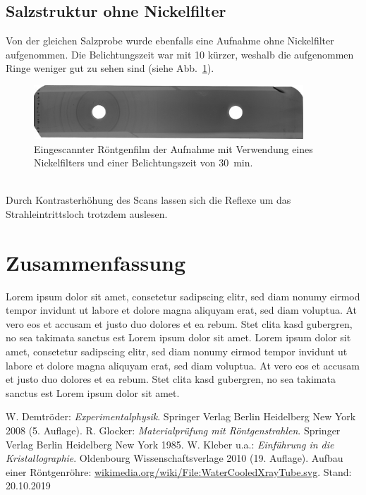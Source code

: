 \documentclass[a4paper,twoside,final]{article}
\begin{document}
\subsection{Salzstruktur ohne Nickelfilter}
Von der gleichen Salzprobe wurde ebenfalls eine Aufnahme ohne Nickelfilter aufgenommen. Die Belichtungszeit war mit \SI{10}{\min} kürzer, weshalb die aufgenommen Ringe weniger gut zu sehen sind (siehe Abb.~\ref{fig:Film_ohneFilter}).
\begin{figure}[htp]
    \centering
        \includegraphics[width=0.9\textwidth]{Abbildungen/Roentgenfilm_ohne_Filter.jpg}
    \caption{Eingescannter Röntgenfilm der Aufnahme mit Verwendung eines Nickelfilters und einer Belichtungszeit von \SI{30}{\minute}.}
    \label{fig:Film_ohneFilter}
\end{figure}\\
Durch Kontrasterhöhung des Scans lassen sich die Reflexe um das Strahleintrittsloch trotzdem auslesen.
\section{Zusammenfassung}
Lorem ipsum dolor sit amet, consetetur sadipscing elitr, sed diam nonumy eirmod tempor invidunt ut labore et dolore magna aliquyam erat, sed diam voluptua. At vero eos et accusam et justo duo dolores et ea rebum. Stet clita kasd gubergren, no sea takimata sanctus est Lorem ipsum dolor sit amet. Lorem ipsum dolor sit amet, consetetur sadipscing elitr, sed diam nonumy eirmod tempor invidunt ut labore et dolore magna aliquyam erat, sed diam voluptua. At vero eos et accusam et justo duo dolores et ea rebum. Stet clita kasd gubergren, no sea takimata sanctus est Lorem ipsum dolor sit amet.


\begin{thebibliography}{xxx}
	W. Demtröder: \textit{Experimentalphysik}. Springer Verlag Berlin Heidelberg New York 2008 (5. Auflage).
	R. Glocker: \textit{Materialprüfung mit Röntgenstrahlen}. Springer Verlag Berlin Heidelberg New York 1985.
	W. Kleber u.a.: \textit{Einführung in die Kristallographie}. Oldenbourg Wissenschaftsverlage 2010 (19. Auflage).
  Aufbau einer Röntgenröhre: \url{wikimedia.org/wiki/File:WaterCooledXrayTube.svg}. Stand: 20.10.2019
\end{thebibliography}
\end{document}
